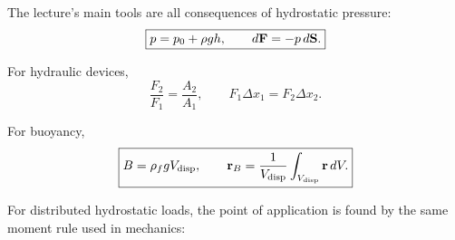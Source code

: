 \documentclass[../main.tex]{subfiles}
\begin{document}
The lecture's main tools are all consequences of hydrostatic pressure:
\begin{equation}
  \boxed{p=p_0+\rho gh,\qquad d\mathbf{F}=-p\,d\mathbf{S}.}
  \label{eq:lec11_summary_tools}
\end{equation}

For hydraulic devices,
\begin{equation}
  \boxed{\frac{F_2}{F_1}=\frac{A_2}{A_1},
  \qquad
  F_1\Delta x_1=F_2\Delta x_2.}
  \label{eq:lec11_summary_hydraulics}
\end{equation}

For buoyancy,
\begin{equation}
  \boxed{B=\rho_f gV_{\mathrm{disp}},\qquad
  \mathbf{r}_B=\frac{1}{V_{\mathrm{disp}}}\int_{V_{\mathrm{disp}}}\mathbf{r}\,dV.}
  \label{eq:lec11_summary_buoyancy}
\end{equation}

For distributed hydrostatic loads, the point of application is found by the same moment rule used in mechanics:
\
\end{document}
